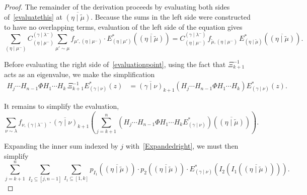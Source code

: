 \documentclass[ALCO]{cedram}
\newcommand{\Estar}[1]{E^*_{#1}}
\newcommand{\gammalambdamin}{{(\gamma \mid \lambda^-)}}
\newcommand{\gammanu}{{(\gamma \mid \nu)}}
\newcommand{\etamu}{{(\eta \mid \mu^-)}}
\newcommand{\etamuprime}{{(\eta \mid \mu')}}
\newcommand{\mutilde}{{\widetilde{\mu}}}
\newcommand{\etamutilde}{{(\eta \mid \widetilde{\mu})}}
\newcommand{\pIoneevaluated}{p_{I_1}\left(\overline{\etamutilde}\right)}
\newcommand{\pItwoevaluated}{p_{2}\left(\overline{\etamutilde}\right)}
\newcommand{\fnu}{f_{\nu, \gammalambdamin}}
\newcommand{\gmutilde}{f_{\mutilde,\etamu}}
\begin{document}
\begin{proof}The remainder of the derivation proceeds by evaluating both sides of~\eqref{evaluatethis} at $\overline{\etamutilde}$. Because the sums in the left side were constructed to have no overlapping terms, evaluation of the left side of the equation gives
\[ \sum_{\etamu} C^{\gammalambdamin}_{\etamu} \sum_{\mu' \sim \mu} f_{\mu',\etamu} \cdot \Estar{\etamuprime}\left(\overline{(\eta \mid \widetilde{\mu})}\right)= C^{\gammalambdamin}_{\etamu} \, \gmutilde \,\Estar{\etamutilde} \left( \overline{\etamutilde}\right). \]

Before evaluating the right side of~\eqref{evaluationpoint}, using the fact that $\Xi^{-1}_{k+1}$ acts as an eigenvalue, we make the simplification
\begin{align*}
    H_j \dotsm H_{n-1} \Phi H_1 \dotsm H_{k} \, \Xi_{k+1}^{-1}   \Estar{\gammanu}(z) 
    &=\overline{\gammanu}_{k+1} \left( H_j \dotsm H_{n-1} \Phi H_1 \dotsm H_{k} \right)  \Estar{\gammanu}(z).
\end{align*}

It remains to simplify the evaluation,
\begin{equation}\label{unsimplifiedsum} \sum_{\nu \sim \lambda} \fnu \cdot \overline{\gammanu}_{k+1} \left( \sum_{j=k+1}^n   \left( H_j \dotsm H_{n-1} \Phi H_1 \dotsm H_{k} \Estar{\gammanu} \right)\left(\overline{\etamutilde}\right)\right).\end{equation}

Expanding the inner sum indexed by $j$ with~\eqref{Expandedright}, we must then simplify
\[  \sum_{j=k+1}^n \,   \sum_{I_2\subseteq [j, n-1]} \sum_{I_1 \subseteq [1,k]}\pIoneevaluated \cdot \pItwoevaluated \cdot \Estar{\gammanu}\left(I_2\left(I_1\left(\overline{\etamutilde}\right)\right)\right).\]


\end{proof}
\end{document}
